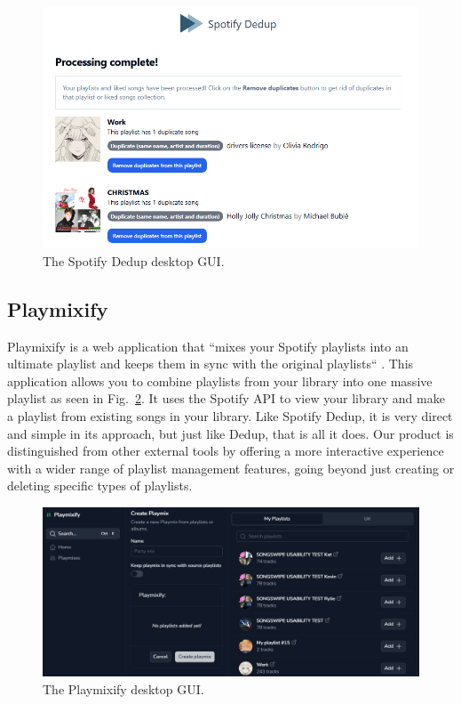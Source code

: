 \documentclass{article}
\begin{document}
\begin{figure}[ht]
  \centering
  \includegraphics[width=\textwidth]{./dedupss.png}
  \caption{The Spotify Dedup desktop GUI.}
  \label{fig:dedup}
\end{figure}

\pagebreak

\subsection{Playmixify}
\quad Playmixify is a web application that ``mixes your Spotify playlists into an ultimate playlist and keeps them in sync with the original playlists`` \cite{Spotify_app}. This application allows you to combine playlists from your library into one massive playlist as seen in Fig.~\ref{fig:playmixify}. It uses the Spotify API to view your library and make a playlist from existing songs in your library. Like Spotify Dedup, it is very direct and simple in its approach, but just like Dedup, that is all it does. Our product is distinguished from other external tools by offering a more interactive experience with a wider range of playlist management features, going beyond just creating or deleting specific types of playlists.

\begin{figure}[ht]
  \centering
  \includegraphics[width=5 in]{./playmixifyss.png}
  \caption{The Playmixify desktop GUI.}
  \label{fig:playmixify}
\end{figure}
\end{document}
